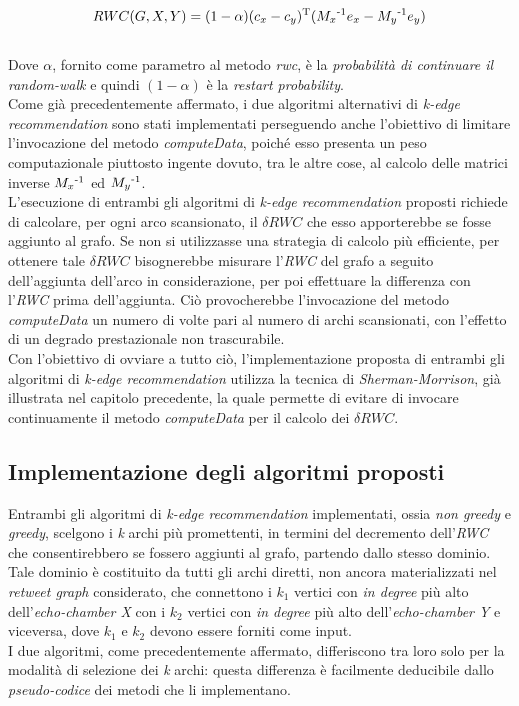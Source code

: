 \\
\begin{equation}
RWC(G,X,Y) = (1 - \alpha)(c_x - c_y)\textsuperscript{T}(M_x\textsuperscript{-1}e_x - M_y\textsuperscript{-1}e_y)
\end{equation}
\\
Dove $\alpha$, fornito come parametro al metodo \textit{rwc}, è la \textit{probabilità di continuare il random-walk} e quindi $(1-\alpha)$ è la \textit{restart probability}. 
\\Come già precedentemente affermato, i due algoritmi alternativi di \textit{k-edge recommendation} sono stati implementati perseguendo anche l'obiettivo di limitare l'invocazione del metodo \textit{computeData}, poiché esso presenta un peso computazionale piuttosto ingente dovuto, tra le altre cose, al calcolo delle matrici inverse  $M_x\textsuperscript{-1}$ ed $M_y\textsuperscript{-1}$. 
\\L'esecuzione di entrambi gli algoritmi di \textit{k-edge recommendation} proposti richiede di calcolare, per ogni arco scansionato, il \textit{$\delta RWC$} che esso apporterebbe se fosse aggiunto al grafo. Se non si utilizzasse una strategia di calcolo più efficiente, per ottenere tale \textit{$\delta RWC$} bisognerebbe misurare l'\textit{RWC} del grafo a seguito dell'aggiunta dell'arco in considerazione, per poi effettuare la differenza con l'\textit{RWC} prima dell'aggiunta. Ciò provocherebbe l'invocazione del metodo \textit{computeData} un numero di volte pari al numero di archi scansionati, con l'effetto di un degrado prestazionale non trascurabile. \\Con l'obiettivo di ovviare a tutto ciò, l'implementazione proposta di entrambi gli algoritmi di \textit{k-edge recommendation} utilizza la tecnica di \textit{Sherman-Morrison}, già illustrata nel capitolo precedente, la quale permette di evitare di invocare continuamente il metodo \textit{computeData} per il calcolo dei \textit{$\delta RWC$}. 

\subsection{Implementazione degli algoritmi proposti}
Entrambi gli algoritmi di \textit{k-edge recommendation} implementati, ossia \textit{non greedy} e \textit{greedy}, scelgono i \textit{k} archi più promettenti, in termini del decremento dell'\textit{RWC} che consentirebbero se fossero aggiunti al grafo, partendo dallo stesso dominio. Tale dominio è costituito da tutti gli archi diretti, non ancora materializzati nel \textit{retweet graph} considerato, che connettono i \textit{$k_1$} vertici con \textit{in degree} più alto dell'\textit{echo-chamber X} con i \textit{$k_2$} vertici con \textit{in degree} più alto dell'\textit{echo-chamber Y} e viceversa, dove \textit{$k_1$} e \textit{$k_2$} devono essere forniti come input. 
\\I due algoritmi, come precedentemente affermato, differiscono tra loro solo per la modalità di selezione dei \textit{k} archi: questa differenza è facilmente deducibile dallo \textit{pseudo-codice} dei metodi che li implementano.

